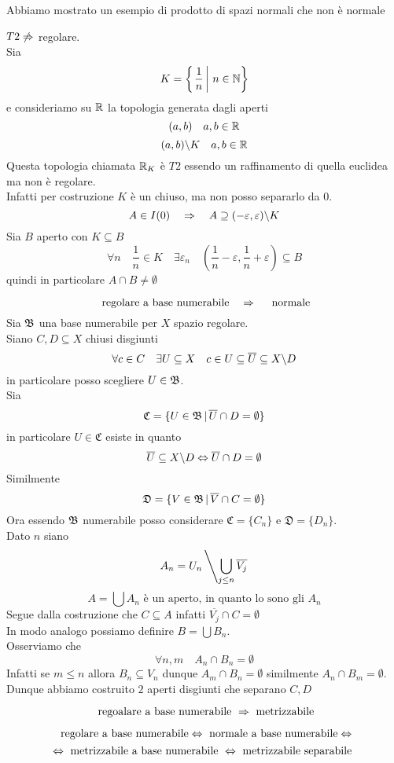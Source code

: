 \begin{oss}Abbiamo mostrato un esempio di prodotto di spazi normali che non \`e normale
\end{oss}
\begin{oss}$T2 \not \Rightarrow$ regolare.\\
Sia $$K=\left\{ \left. \frac{1}{n} \, \right\vert \, n \in \mathbb{N} \right\}$$ e consideriamo su $\mathbb{R}$ la topologia generata dagli aperti 
$$ (a,b) \quad a,b \in \mathbb{R} $$ 
$$ (a,b) \backslash K \quad a,b \in \mathbb{R}$$
Questa topologia chiamata $\mathbb{R}_K$ \`e $T2$ essendo un raffinamento di quella euclidea ma non \`e regolare.\\
Infatti per costruzione $K$ \`e un chiuso, ma non posso separarlo da $0$.
$$ A \in I(0) \quad \Rightarrow \quad A \supseteq (-\varepsilon, \varepsilon) \backslash K$$ 
Sia $B$ aperto con $K \subseteq B$ 
$$ \forall n \quad \frac{1}{n}\in K \quad \exists \varepsilon_n \quad \left(\frac{1}{n}-\varepsilon , \frac{1}{n}+\varepsilon \right) \subseteq B $$
quindi in particolare $A\cap B \neq \emptyset$
\end{oss}
\spazio
\begin{thm}
$$ \text{ regolare a base numerabile} \quad \Rightarrow \quad \text{ normale}$$
\proof Sia $\mathfrak{B}$ una base numerabile per $X$ spazio regolare.\\
Siano $C,D\subseteq X $ chiusi disgiunti 
$$ \forall c \in C \quad \exists U \subseteq X \quad c \in U \subseteq \overline{U}\subseteq X\backslash D $$
in particolare posso scegliere $U \in \mathfrak{B}$.\\
Sia
$$ \mathfrak{C}=\{ U \in \mathfrak{B} \, \vert \, \overline{U}\cap D =\emptyset \}$$
in particolare $U \in \mathfrak{C}$ esiste in quanto $$ \overline{U} \subseteq X\backslash D \Leftrightarrow \overline{U}\cap D=\emptyset$$
Similmente
$$ \mathfrak{D}=\{ V \in \mathfrak{B} \, \vert \, \overline{V}\cap C =\emptyset \}$$
Ora essendo $\mathfrak{B}$ numerabile posso considerare $\mathfrak{C}=\{C_n\}$ e $\mathfrak{D}=\{ D_n\}$.\\
Dato $n$ siano 
$$ A_n = U_n \left\backslash \bigcup_{j\leq n }\overline{V_j}\right.$$
$$ A = \bigcup A_n \text{ \`e un aperto, in quanto lo sono gli  } A_n  $$
Segue dalla costruzione che $C \subseteq A $ infatti $\overline{V_j}\cap C = \emptyset$\\
In modo analogo possiamo definire $B=\bigcup B_n$.\\
Osserviamo che 
$$ \forall n, m \quad A_n \cap B_n =\emptyset $$
Infatti se $m\leq n $ allora $B_n \subseteq V_n$ dunque $A_m \cap B_n =\emptyset$  similmente $A_n \cap B_m =\emptyset$.\\
Dunque abbiamo costruito $2$ aperti disgiunti che separano $C,D$
\endproof
\end{thm}
\spazio 
\begin{thm}\bianco
$$ \text{ regoalare a base numerabile } \Rightarrow \text{ metrizzabile}$$
\end{thm}
\begin{cor}
$$ \text{ regolare a base numerabile} \Leftrightarrow \text{ normale a base numerabile} \Leftrightarrow$$ $$ \Leftrightarrow \text{ metrizzabile a base numerabile } \Leftrightarrow \text{ metrizzabile separabile } $$
\end{cor}
\newpage
